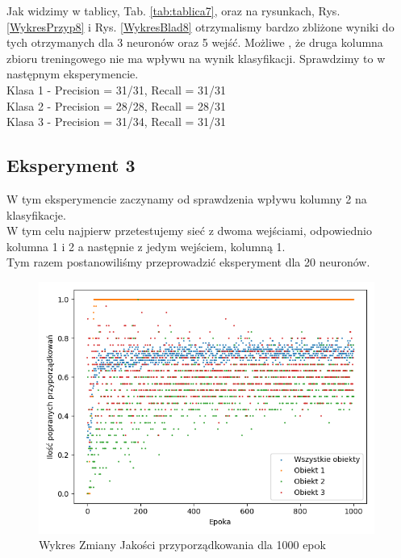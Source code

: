 \documentclass[12pt]{article}
\begin{document}
Jak widzimy w tablicy, Tab. \ref{tab:tablica7}, oraz na rysunkach, Rys. \ref{WykresPrzyp8} i Rys. \ref{WykresBlad8} otrzymalismy bardzo zbliżone wyniki do tych otrzymanych dla 3 neuronów oraz 5 wejść. Możliwe , że druga kolumna zbioru treningowego nie ma wpływu na wynik klasyfikacji. Sprawdzimy to w następnym eksperymencie.
\\Klasa 1 - Precision = 31/31, Recall = 31/31\\
Klasa 2 - Precision = 28/28, Recall = 28/31\\
Klasa 3 - Precision = 31/34, Recall = 31/31\\
\newpage
\subsection {Eksperyment 3}
W tym eksperymencie zaczynamy od sprawdzenia wpływu kolumny 2 na klasyfikacje.\\W tym celu najpierw przetestujemy sieć z dwoma wejściami, odpowiednio kolumna 1 i 2 a następnie z jedym wejściem, kolumną 1.\\
Tym razem postanowiliśmy przeprowadzić eksperyment dla 20 neuronów.

\newpage

\begin{figure}[!ht]
 \centering
 \includegraphics[width=11cm]{WykresPrzyporzadkowania20neuron2wejscia1.png}
 \caption{Wykres Zmiany Jakości przyporządkowania dla 1000 epok}
 \vspace{-0.1cm}
 \label{WykresPrzyp9}
\end{figure}
\end{document}

